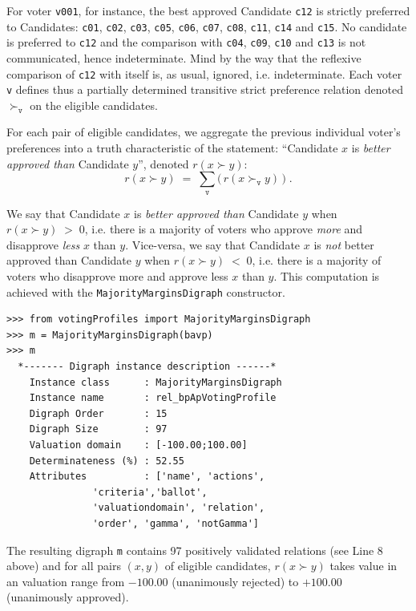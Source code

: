 For voter \texttt{v001}, for instance, the best approved Candidate \texttt{c12} is strictly preferred to Candidates: \texttt{c01}, \texttt{c02}, \texttt{c03}, \texttt{c05}, \texttt{c06}, \texttt{c07}, \texttt{c08}, \texttt{c11}, \texttt{c14} and \texttt{c15}. No candidate is preferred to \texttt{c12} and the comparison with \texttt{c04}, \texttt{c09}, \texttt{c10} and \texttt{c13} is not communicated, hence indeterminate. Mind by the way that the reflexive comparison of \texttt{c12} with itself is, as usual, ignored, i.e. indeterminate. Each voter \texttt{v} defines thus a partially determined transitive strict preference relation denoted $\succ_{\mathtt{v}}$ on the eligible candidates.

For each pair of eligible candidates, we aggregate the previous individual voter's preferences into a truth characteristic of the statement: ``Candidate $x$ is \emph{better approved than} Candidate $y$'', denoted $r(x \succ y)$:
\begin{equation}
  r(x \succ y)\;=\; \sum_{\mathtt{v}} \big(\,r(x \succ_{\mathtt{v}} y)\, \big)\;.
\end{equation}  

We say that Candidate $x$ is \emph{better approved than} Candidate $y$ when $r(x \succ y)\;>\;0$, i.e. there is a majority of voters who approve \emph{more} and disapprove \emph{less} $x$ than $y$. Vice-versa, we say that Candidate $x$ is \emph{not} better approved than Candidate $y$ when $r(x \succ y)\;<\;0$, i.e. there is a majority of voters who disapprove more and approve less $x$ than $y$. This computation is achieved with the \texttt{MajorityMarginsDigraph} constructor.
\begin{lstlisting}
>>> from votingProfiles import MajorityMarginsDigraph
>>> m = MajorityMarginsDigraph(bavp)
>>> m
  *------- Digraph instance description ------*
    Instance class      : MajorityMarginsDigraph
    Instance name       : rel_bpApVotingProfile
    Digraph Order       : 15
    Digraph Size        : 97
    Valuation domain    : [-100.00;100.00]
    Determinateness (%) : 52.55
    Attributes          : ['name', 'actions',
               'criteria','ballot',
               'valuationdomain', 'relation',
               'order', 'gamma', 'notGamma']
\end{lstlisting}

The resulting digraph \texttt{m} contains 97 positively validated relations (see Line 8 above) and for all pairs $(x,y)$ of eligible candidates, $r(x \succ y)$ takes value in an valuation range from $-100.00$ (unanimously rejected) to $+100.00$ (unanimously approved).

